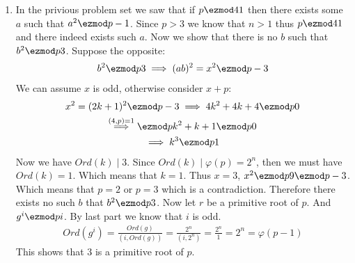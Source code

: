 \begin{enumerate}[label=]
    \item 
        In the privious problem set we saw that if $p \ezmod 4 1$ then there exists some $a$ such that $a^2 \ezmod p -1$. Since $p > 3$ we know that $n > 1$ thus $p \ezmod 4 1$ and there indeed exists such $a$. Now we show that there is no $b$ such that $b^2 \ezmod p 3$. Suppose the opposite:
        \begin{gather*}
            b^2 \ezmod p 3 \implies (ab)^2 = x^2 \ezmod p -3
        \end{gather*}
        We can assume $x$ is odd, otherwise consider $x + p$:
        \begin{gather*}
            x^2 = (2k + 1)^2 \ezmod p -3 \implies 4k^2 + 4k + 4 \ezmod p 0 \\
            \overset{(4, p)=1 }{\implies} \ezmod p k^2 + k + 1 \ezmod p 0 \\
            \implies k^3 \ezmod p 1
        \end{gather*}
        Now we have $Ord(k) \mid 3$. Since $Ord(k) \mid \varphi(p) = 2^n$, then we must have $Ord(k) = 1$. Which means that $k = 1$. Thus $x = 3$, $x^2 \ezmod p 9 \ezmod p -3$. Which means that $p = 2$ or $p = 3$ which is a contradiction. Therefore there exists no such $b$ that $b^2 \ezmod p 3$. 
        Now let $r$ be a primitive root of $p$. And $g^i \ezmod p i$. By last part we know that $i$ is odd.
        \begin{gather*}
            Ord(g^i) = \frac{Ord(g)}{(i, Ord(g))} = \frac{2^n}{(i, 2^n)} = \frac{2^n}{1} = 2^n = \varphi(p - 1)
        \end{gather*}
        This shows that $3$ is a primitive root of $p$.
\end{enumerate}